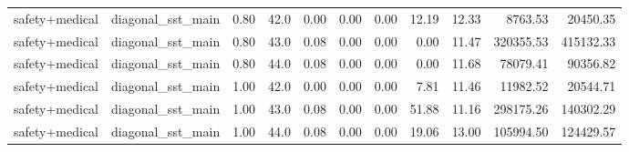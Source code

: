 \documentclass{article}
\begin{document}
\begin{table}[H]
{\begin{tabular}{llllrrrrrrr}
safety+medical & diagonal\_sst\_main & 0.80 & 42.0 & 0.00 & 0.00 & 0.00 & 12.19 & 12.33 & 8763.53 & 20450.35 \\
safety+medical & diagonal\_sst\_main & 0.80 & 43.0 & 0.08 & 0.00 & 0.00 & 0.00 & 11.47 & 320355.53 & 415132.33 \\
safety+medical & diagonal\_sst\_main & 0.80 & 44.0 & 0.08 & 0.00 & 0.00 & 0.00 & 11.68 & 78079.41 & 90356.82 \\
safety+medical & diagonal\_sst\_main & 1.00 & 42.0 & 0.00 & 0.00 & 0.00 & 7.81 & 11.46 & 11982.52 & 20544.71 \\
safety+medical & diagonal\_sst\_main & 1.00 & 43.0 & 0.08 & 0.00 & 0.00 & 51.88 & 11.16 & 298175.26 & 140302.29 \\
safety+medical & diagonal\_sst\_main & 1.00 & 44.0 & 0.08 & 0.00 & 0.00 & 19.06 & 13.00 & 105994.50 & 124429.57 \\
\bottomrule
\end{tabular}
}
\end{table}
\end{document}
